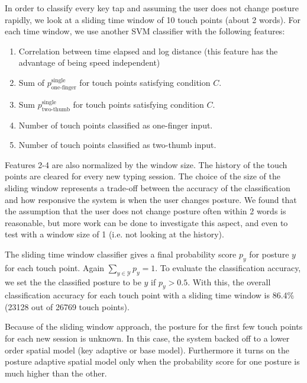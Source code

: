 \documentclass{sigchi}
\begin{document}
In order to classify every key tap and assuming the user does not change posture 
rapidly, we look at a sliding time window of 10 touch points (about 2 words). For 
each time window, we use another SVM classifier with the following features:
\begin{enumerate}
\item Correlation between time elapsed and log distance (this feature has the
advantage of being speed independent)
\item Sum of $p_\text{one-finger}^{\text{single}}$ for touch points satisfying condition $C$.
\item Sum $p_\text{two-thumb}^{\text{single}}$ for touch points satisfying condition $C$.
\item Number of touch points classified as one-finger input.
\item Number of touch points classified as two-thumb input.
\end{enumerate}
Features 2-4 are also normalized by the window size. The history of the touch points are cleared for every new typing session.
The choice of the size of the sliding window represents a trade-off between the 
accuracy of the classification and how responsive the system is when the user
changes posture. We found that the assumption that the user does not change posture
often within 2 words is reasonable, but more work can be done to investigate this
aspect, and even to test with a window size of 1 (i.e. not 
looking at the history).

The sliding time window classifier gives a final probability score $p_y$ for posture
$y$ for each touch point. Again $\displaystyle\sum_{y\in \mathcal{Y}}p_y = 1$. To evaluate the classification accuracy, we set the the
classified posture to be $y$ if $p_y > 0.5$. With this, the overall classification 
accuracy for each touch point with a sliding time window
is 86.4\% (23128 out of 26769 touch points).

Because of the sliding window approach, the posture for the first few touch points  
for each new session is unknown. In this case, the system backed off to a lower order spatial 
model (key adaptive or base model). Furthermore  it turns on the posture 
adaptive spatial model only when the probability score for one posture is much 
higher than the other.

\end{document}
